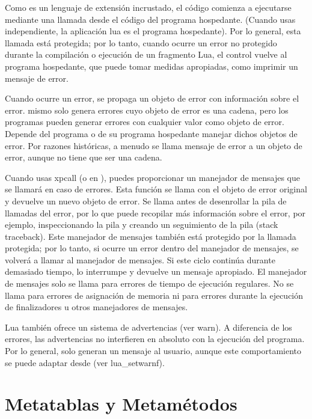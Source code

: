 Como  es un lenguaje de extensión incrustado, el código  comienza a ejecutarse mediante una llamada desde el código  del programa hospedante. (Cuando usas  independiente, la aplicación lua es el programa hospedante). Por lo general, esta llamada está protegida; por lo tanto, cuando ocurre un error no protegido durante la compilación o ejecución de un fragmento Lua, el control vuelve al programa hospedante, que puede tomar medidas apropiadas, como imprimir un mensaje de error.

Cuando ocurre un error, se propaga un objeto de error con información sobre el error.  mismo solo genera errores cuyo objeto de error es una cadena, pero los programas pueden generar errores con cualquier valor como objeto de error. Depende del programa  o de su programa hospedante manejar dichos objetos de error. Por razones históricas, a menudo se llama mensaje de error a un objeto de error, aunque no tiene que ser una cadena.

Cuando usas xpcall (o  en ), puedes proporcionar un manejador de mensajes que se llamará en caso de errores. Esta función se llama con el objeto de error original y devuelve un nuevo objeto de error. Se llama antes de desenrollar la pila de llamadas del error, por lo que puede recopilar más información sobre el error, por ejemplo, inspeccionando la pila y creando un seguimiento de la pila (stack traceback). Este manejador de mensajes también está protegido por la llamada protegida; por lo tanto, si ocurre un error dentro del manejador de mensajes, se volverá a llamar al manejador de mensajes. Si este ciclo continúa durante demasiado tiempo,  lo interrumpe y devuelve un mensaje apropiado. El manejador de mensajes solo se llama para errores de tiempo de ejecución regulares. No se llama para errores de asignación de memoria ni para errores durante la ejecución de finalizadores u otros manejadores de mensajes.

Lua también ofrece un sistema de advertencias (ver warn). A diferencia de los errores, las advertencias no interfieren en absoluto con la ejecución del programa. Por lo general, solo generan un mensaje al usuario, aunque este comportamiento se puede adaptar desde  (ver lua\_setwarnf).

\section{Metatablas y Metamétodos}


